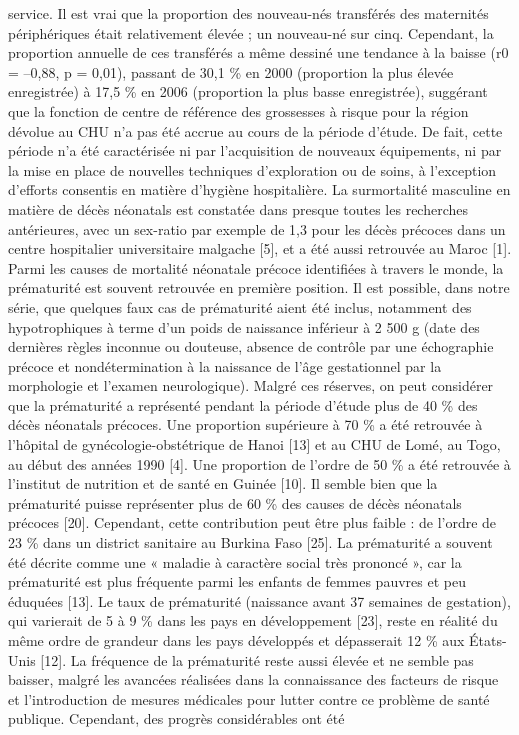 \documentclass[
]{book}
\begin{document}
service. Il est vrai que la proportion des nouveau-nés
transférés des maternités périphériques était relativement
élevée ; un nouveau-né sur cinq. Cependant, la proportion
annuelle de ces transférés a même dessiné une tendance à la
baisse (r0 = --0,88, p = 0,01), passant de 30,1 \% en 2000
(proportion la plus élevée enregistrée) à 17,5 \% en 2006
(proportion la plus basse enregistrée), suggérant que la
fonction de centre de référence des grossesses à risque pour
la région dévolue au CHU n'a pas été accrue au cours de
la période d'étude. De fait, cette période n'a été caractérisée
ni par l'acquisition de nouveaux équipements, ni par la mise
en place de nouvelles techniques d'exploration ou de soins,
à l'exception d'efforts consentis en matière d'hygiène
hospitalière.
La surmortalité masculine en matière de décès néonatals
est constatée dans presque toutes les recherches antérieures,
avec un sex-ratio par exemple de 1,3 pour les décès précoces
dans un centre hospitalier universitaire malgache {[}5{]}, et a été
aussi retrouvée au Maroc {[}1{]}.
Parmi les causes de mortalité néonatale précoce identifiées
à travers le monde, la prématurité est souvent retrouvée en
première position. Il est possible, dans notre série, que
quelques faux cas de prématurité aient été inclus, notamment
des hypotrophiques à terme d'un poids de naissance inférieur
à 2 500 g (date des dernières règles inconnue ou douteuse,
absence de contrôle par une échographie précoce et nondétermination
à la naissance de l'âge gestationnel par la
morphologie et l'examen neurologique). Malgré ces réserves,
on peut considérer que la prématurité a représenté
pendant la période d'étude plus de 40 \% des décès néonatals
précoces. Une proportion supérieure à 70 \% a été retrouvée
à l'hôpital de gynécologie-obstétrique de Hanoi {[}13{]} et au
CHU de Lomé, au Togo, au début des années 1990 {[}4{]}. Une
proportion de l'ordre de 50 \% a été retrouvée à l'institut de
nutrition et de santé en Guinée {[}10{]}.
Il semble bien que la prématurité puisse représenter plus
de 60 \% des causes de décès néonatals précoces {[}20{]}.
Cependant, cette contribution peut être plus faible : de
l'ordre de 23 \% dans un district sanitaire au Burkina
Faso {[}25{]}.
La prématurité a souvent été décrite comme une « maladie
à caractère social très prononcé », car la prématurité est plus
fréquente parmi les enfants de femmes pauvres et peu
éduquées {[}13{]}. Le taux de prématurité (naissance avant
37 semaines de gestation), qui varierait de 5 à 9 \% dans les
pays en développement {[}23{]}, reste en réalité du même ordre
de grandeur dans les pays développés et dépasserait 12 \%
aux États-Unis {[}12{]}.
La fréquence de la prématurité reste aussi élevée et ne
semble pas baisser, malgré les avancées réalisées dans la
connaissance des facteurs de risque et l'introduction de
mesures médicales pour lutter contre ce problème de santé
publique. Cependant, des progrès considérables ont été
\end{document}
